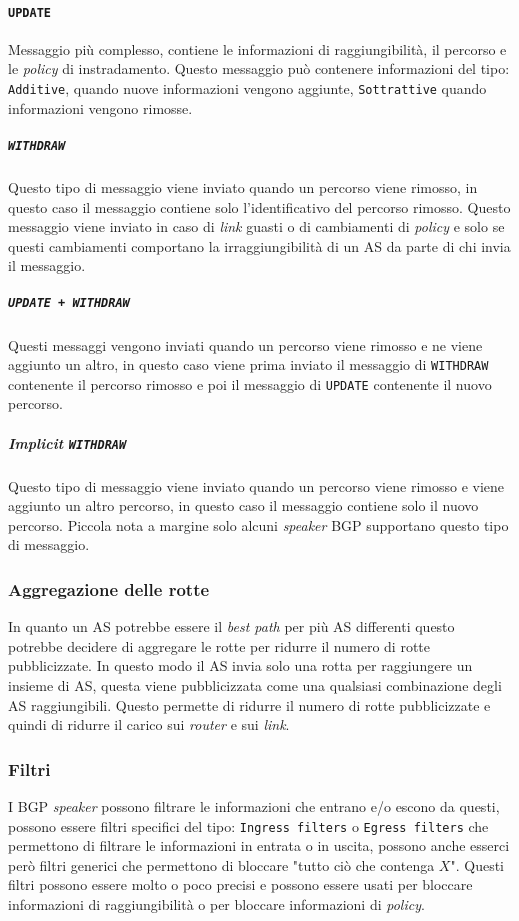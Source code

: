             \paragraph{\texttt{UPDATE}} Messaggio più complesso, contiene le informazioni di raggiungibilità, il percorso e le \textit{policy} di instradamento. Questo messaggio può contenere informazioni del tipo: \texttt{Additive}, quando nuove informazioni vengono aggiunte, \texttt{Sottrattive} quando informazioni vengono rimosse.
                \subparagraph{\texttt{WITHDRAW}} Questo tipo di messaggio viene inviato quando un percorso viene rimosso, in questo caso il messaggio contiene solo l'identificativo del percorso rimosso. Questo messaggio viene inviato in caso di \textit{link} guasti o di cambiamenti di \textit{policy} e solo se questi cambiamenti comportano la irraggiungibilità di un \Acrshort*{AS} da parte di chi invia il messaggio.
                \subparagraph{\texttt{UPDATE + WITHDRAW}} Questi messaggi vengono inviati quando un percorso viene rimosso e ne viene aggiunto un altro, in questo caso viene prima inviato il messaggio di \texttt{WITHDRAW} contenente il percorso rimosso e poi il messaggio di \texttt{UPDATE} contenente il nuovo percorso.
                \subparagraph{\textit{Implicit} \texttt{WITHDRAW}} Questo tipo di messaggio viene inviato quando un percorso viene rimosso e viene aggiunto un altro percorso, in questo caso il messaggio contiene solo il nuovo percorso. Piccola nota a margine solo alcuni \textit{speaker} \Acrshort*{BGP} supportano questo tipo di messaggio.
        \subsubsection{Aggregazione delle rotte}
            In quanto un \Acrshort*{AS} potrebbe essere il \textit{best path} per più \Acrshort*{AS} differenti questo potrebbe decidere di aggregare le rotte per ridurre il numero di rotte pubblicizzate. In questo modo il \Acrshort*{AS} invia solo una rotta per raggiungere un insieme di \Acrshort*{AS}, questa viene pubblicizzata come una qualsiasi combinazione degli \Acrshort*{AS} raggiungibili. Questo permette di ridurre il numero di rotte pubblicizzate e quindi di ridurre il carico sui \textit{router} e sui \textit{link}.
        \subsubsection{Filtri}
            I \Acrshort*{BGP} \textit{speaker} possono filtrare le informazioni che entrano e/o escono da questi, possono essere filtri specifici del tipo: \texttt{Ingress filters} o \texttt{Egress filters} che permettono di filtrare le informazioni in entrata o in uscita, possono anche esserci però filtri generici che permettono di bloccare "tutto ciò che contenga $X$". Questi filtri possono essere molto o poco precisi e possono essere usati per bloccare informazioni di raggiungibilità o per bloccare informazioni di \textit{policy}.

